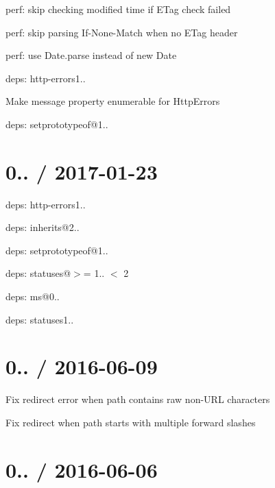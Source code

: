 \begin{DoxyItemize}
\begin{DoxyItemize}
\item perf\+: skip checking modified time if E\+Tag check failed
\item perf\+: skip parsing {\ttfamily If-\/\+None-\/\+Match} when no {\ttfamily E\+Tag} header
\item perf\+: use {\ttfamily Date.\+parse} instead of {\ttfamily new Date}
\end{DoxyItemize}
\item deps\+: http-\/errors1..
\begin{DoxyItemize}
\item Make {\ttfamily message} property enumerable for {\ttfamily Http\+Error}s
\item deps\+: setprototypeof@1..
\end{DoxyItemize}
\end{DoxyItemize}

\section*{0.. / 2017-\/01-\/23 }


\begin{DoxyItemize}
\item deps\+: http-\/errors1..
\begin{DoxyItemize}
\item deps\+: inherits@2..
\item deps\+: setprototypeof@1..
\item deps\+: statuses@\textquotesingle{}$>$= 1.. $<$ 2\textquotesingle{}
\end{DoxyItemize}
\item deps\+: ms@0..
\item deps\+: statuses1..
\end{DoxyItemize}

\section*{0.. / 2016-\/06-\/09 }


\begin{DoxyItemize}
\item Fix redirect error when {\ttfamily path} contains raw non-\/\+U\+RL characters
\item Fix redirect when {\ttfamily path} starts with multiple forward slashes
\end{DoxyItemize}

\section*{0.. / 2016-\/06-\/06 }


